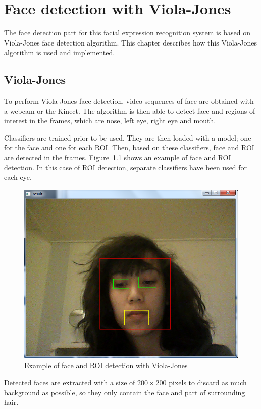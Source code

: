 \chapter{Face detection with Viola-Jones}
\label{chap:implementation_violajones}

\noindent The face detection part for this facial expression recognition system is based on Viola-Jones face detection algorithm. This chapter describes how this Viola-Jones algorithm is used and implemented.

\section{Viola-Jones}

\vspace{\baselineskip}
\noindent To perform Viola-Jones face detection, video sequences of face are obtained with a webcam or the Kinect. The algorithm is then able to detect face and regions of interest in the frames, which are nose, left eye, right eye and mouth. 
\newline

\noindent Classifiers are trained prior to be used. They are then loaded with a model; one for the face and one for each ROI. Then, based on these classifiers, face and ROI are detected in the frames. Figure~\ref{violajones_implementation_example} shows an example of face and ROI detection. In this case of ROI detection, separate classifiers have been used for each eye. 
\newline

\begin{figure}[!h]
\begin{center}
\noindent \includegraphics[scale=0.4]{figures/violajones_implementation_example} 
\newline
\caption{Example of face and ROI detection with Viola-Jones}
\label{violajones_implementation_example}
\end{center} 
\end{figure}

\noindent Detected faces are extracted with a size of $ 200\times200 $ pixels to discard as much background as possible, so they only contain the face and part of surrounding hair.
